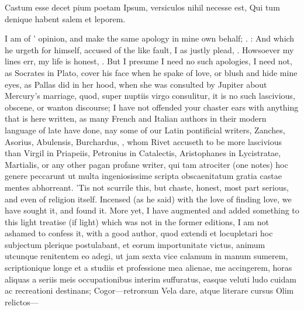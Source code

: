 {Castum esse decet pium poetam
Ipsum, versiculos nihil necesse est,
Qui tum denique habent salem et leporem.

I am of \Catullus{}' opinion, and make the same apology in mine own
behalf; .  : And which he urgeth for himself,
accused of the like fault, I as justly plead, . Howsoever my lines err, my life is honest,
. But I presume I need no
such apologies, I need not, as Socrates in Plato, cover his face when
he spake of love, or blush and hide mine eyes, as Pallas did in her
hood, when she was consulted by Jupiter about Mercury's marriage, quod,
super nuptiis virgo consulitur, it is no such lascivious, obscene, or
wanton discourse; I have not offended your chaster ears with anything
that is here written, as many French and Italian authors in their
modern language of late have done, nay some of our Latin pontificial
writers, Zanches, Asorius, Abulensis, Burchardus, \etc{}, whom Rivet
accuseth to be more lascivious than Virgil in Priapeiis, Petronius in
Catalectis, Aristophanes in Lycistratae, Martialis, or any other pagan
profane writer, qui tam atrociter (one notes) hoc genere
peccarunt ut multa ingeniosissime scripta obscaenitatum gratia castae
mentes abhorreant. 'Tis not scurrile this, but chaste, honest, most
part serious, and even of religion itself. Incensed (as he said)
with the love of finding love, we have sought it, and found it. More
yet, I have augmented and added something to this light treatise (if
light) which was not in the former editions, I am not ashamed to
confess it, with a good author, quod extendi et locupletari hoc
subjectum plerique postulabant, et eorum importunitate victus, animum
utcunque renitentem eo adegi, ut jam sexta vice calamum in manum
sumerem, scriptionique longe et a studiis et professione mea alienae,
me accingerem, horas aliquas a seriis meis occupationibus interim
suffuratus, easque veluti ludo cuidam ac recreationi destinans;
Cogor---retrorsum
Vela dare, atque literare cursus
Olim relictos---

}
